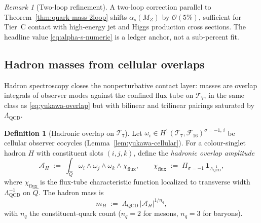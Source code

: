 \documentclass[aps,prd,onecolumn,amsmath,amssymb,nofootinbib,11pt]{revtex4-2}
\numberwithin{equation}{section}
\theoremstyle{plain}
\theoremstyle{definition}
\newtheorem{definition}[theorem]{Definition}
\theoremstyle{remark}
\newtheorem{remark}[theorem]{Remark}
\begin{document}
\begin{remark}[Two-loop refinement]
A two-loop correction parallel to Theorem~\ref{thm:quark-mass-2loop} shifts
$\alpha_s(M_Z)$ by $\mathcal{O}(5\%)$, sufficient for Tier~C contact with
high-energy jet and Higgs production cross sections. The headline value
\eqref{eq:alpha-s-numeric} is a ledger anchor, not a sub-percent fit.
\end{remark}

\subsection{Hadron masses from cellular overlaps}
\label{sec:qcd:hadrons}

Hadron spectroscopy closes the nonperturbative contact layer: masses are
overlap integrals of observer modes against the confined flux tube on
$\mathcal{T}_7$, in the same class as \eqref{eq:yukawa-overlap} but with
bilinear and trilinear pairings saturated by $\Lambda_{\mathrm{QCD}}$.

\begin{definition}[Hadronic overlap on $\mathcal{T}_7$]
\label{def:hadron-overlap}
Let $\omega_i\in H^1(\mathcal{T}_7,\mathcal{F}_{16})^{\sigma=-1,\,i}$ be
cellular observer cocycles (Lemma~\ref{lem:yukawa-cellular}). For a colour-singlet
hadron $H$ with constituent slots $(i,j,k)$, define the \emph{hadronic
overlap amplitude}
\begin{equation}\label{eq:hadron-overlap}
  \mathcal{A}_H
  \;:=\;
  \int_{\hat Q}
  \omega_i \wedge \omega_j \wedge \omega_k \wedge \chi_{\mathrm{flux}},
  \qquad
  \chi_{\mathrm{flux}}
  \;:=\;
  \Pi_{\sigma=-1}\,\mathbf{1}_{\Lambda_{\mathrm{QCD}}^{-1}},
\end{equation}
where $\chi_{\mathrm{flux}}$ is the flux-tube characteristic function
localized to transverse width $\Lambda_{\mathrm{QCD}}^{-1}$ on $\hat Q$.
The hadron mass is
\begin{equation}\label{eq:hadron-mass-def}
  m_H
  \;:=\;
  \Lambda_{\mathrm{QCD}}\,
  |\mathcal{A}_H|^{\!1/n_q},
\end{equation}
with $n_q$ the constituent-quark count ($n_q=2$ for mesons, $n_q=3$ for
baryons).
\end{definition}
\end{document}
